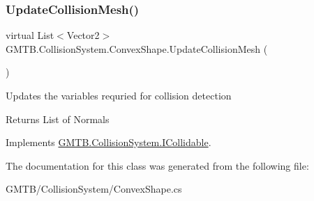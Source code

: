 \mbox{\label{class_g_m_t_b_1_1_collision_system_1_1_convex_shape_a76feae341b6ea65672ffac2f897fdd00}} 
\subsubsection{\texorpdfstring{UpdateCollisionMesh()}{UpdateCollisionMesh()}}
{\footnotesize\ttfamily virtual List$<$Vector2$>$ G\+M\+T\+B.\+Collision\+System.\+Convex\+Shape.\+Update\+Collision\+Mesh (\begin{DoxyParamCaption}{ }\end{DoxyParamCaption})\hspace{0.3cm}{\ttfamily [virtual]}}



Updates the variables requried for collision detection 

\begin{DoxyReturn}{Returns}
List of Normals 
\end{DoxyReturn}


Implements \mbox{\hyperlink{interface_g_m_t_b_1_1_collision_system_1_1_i_collidable}{G\+M\+T\+B.\+Collision\+System.\+I\+Collidable}}.



The documentation for this class was generated from the following file\+:\begin{DoxyCompactItemize}
\item 
G\+M\+T\+B/\+Collision\+System/Convex\+Shape.\+cs\end{DoxyCompactItemize}
